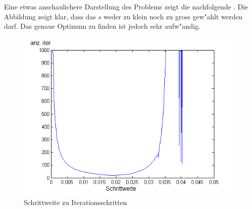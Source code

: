 Eine etwas anschaulichere Darstellung des Problems zeigt die nachfolgende
.
Die Abbildung zeigt klar, dass das $s$ weder zu klein noch zu gross gew"ahlt
werden darf. Das genaue Optimum zu finden ist jedoch sehr aufw"andig.

\begin{figure}
\centering
\includegraphics[height=0.6\textwidth]{descent/step.png}
\caption{Schrittweite zu Iterationsschritten}
\label{step}
\end{figure}
